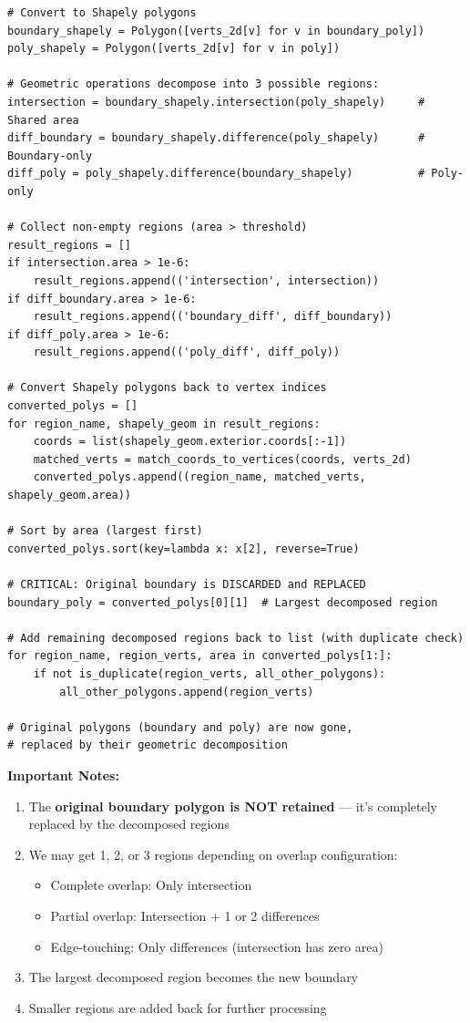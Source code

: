 \documentclass[11pt]{article}
\begin{document}
\begin{lstlisting}[caption={Geometric decomposition of overlapping polygons},label={lst:geometric}]
# Convert to Shapely polygons
boundary_shapely = Polygon([verts_2d[v] for v in boundary_poly])
poly_shapely = Polygon([verts_2d[v] for v in poly])

# Geometric operations decompose into 3 possible regions:
intersection = boundary_shapely.intersection(poly_shapely)     # Shared area
diff_boundary = boundary_shapely.difference(poly_shapely)      # Boundary-only
diff_poly = poly_shapely.difference(boundary_shapely)          # Poly-only

# Collect non-empty regions (area > threshold)
result_regions = []
if intersection.area > 1e-6:
    result_regions.append(('intersection', intersection))
if diff_boundary.area > 1e-6:
    result_regions.append(('boundary_diff', diff_boundary))
if diff_poly.area > 1e-6:
    result_regions.append(('poly_diff', diff_poly))

# Convert Shapely polygons back to vertex indices
converted_polys = []
for region_name, shapely_geom in result_regions:
    coords = list(shapely_geom.exterior.coords[:-1])
    matched_verts = match_coords_to_vertices(coords, verts_2d)
    converted_polys.append((region_name, matched_verts, shapely_geom.area))

# Sort by area (largest first)
converted_polys.sort(key=lambda x: x[2], reverse=True)

# CRITICAL: Original boundary is DISCARDED and REPLACED
boundary_poly = converted_polys[0][1]  # Largest decomposed region

# Add remaining decomposed regions back to list (with duplicate check)
for region_name, region_verts, area in converted_polys[1:]:
    if not is_duplicate(region_verts, all_other_polygons):
        all_other_polygons.append(region_verts)
        
# Original polygons (boundary and poly) are now gone,
# replaced by their geometric decomposition
\end{lstlisting}

\textbf{Important Notes:}
\begin{enumerate}
    \item The \textbf{original boundary polygon is NOT retained} — it's completely replaced by the decomposed regions
    \item We may get 1, 2, or 3 regions depending on overlap configuration:
    \begin{itemize}
        \item Complete overlap: Only intersection
        \item Partial overlap: Intersection + 1 or 2 differences
        \item Edge-touching: Only differences (intersection has zero area)
    \end{itemize}
    \item The largest decomposed region becomes the new boundary
    \item Smaller regions are added back for further processing
\end{enumerate}
\end{document}

